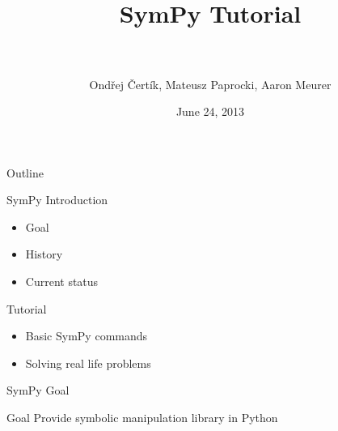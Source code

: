 \documentclass[xcolor=svgnames]{beamer}
\title[SymPy\hspace{4em}\insertframenumber/
\inserttotalframenumber]{~ \\ SymPy Tutorial \\~ }
\author[O. Čertík, M. Paprocki, A. Meurer]
{Ondřej Čertík, Mateusz Paprocki, Aaron Meurer}
\institute{\pgfuseimage{mylogo}}
\date{June 24, 2013}
\begin{document}
\begin{frame}
\maketitle
\end{frame}

\begin{frame}{Outline}
\begin{block}{SymPy Introduction}
\begin{itemize}
\item Goal
\item History
\item Current status
\end{itemize}
\end{block}

\begin{block}{Tutorial}
\begin{itemize}
\item Basic SymPy commands
\item Solving real life problems
\end{itemize}
\end{block}
\end{frame}

\begin{frame}{SymPy Goal}
\begin{block}{Goal}
Provide symbolic manipulation library in Python
\end{block}
\end{frame}
\end{document}
